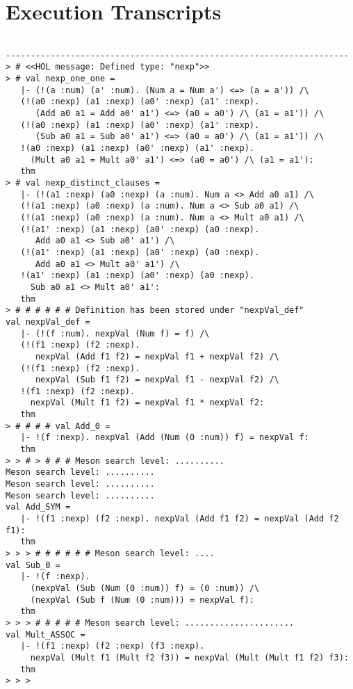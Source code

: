 \documentclass{report}
\begin{document}
\section{Execution Transcripts}
\label{sec:exec-transcr-3}

\setcounter{sessioncount}{0}
\begin{session}
  \begin{scriptsize}
\begin{verbatim}

---------------------------------------------------------------------
> # <<HOL message: Defined type: "nexp">>
> # val nexp_one_one =
   |- (!(a :num) (a' :num). (Num a = Num a') <=> (a = a')) /\
   (!(a0 :nexp) (a1 :nexp) (a0' :nexp) (a1' :nexp).
      (Add a0 a1 = Add a0' a1') <=> (a0 = a0') /\ (a1 = a1')) /\
   (!(a0 :nexp) (a1 :nexp) (a0' :nexp) (a1' :nexp).
      (Sub a0 a1 = Sub a0' a1') <=> (a0 = a0') /\ (a1 = a1')) /\
   !(a0 :nexp) (a1 :nexp) (a0' :nexp) (a1' :nexp).
     (Mult a0 a1 = Mult a0' a1') <=> (a0 = a0') /\ (a1 = a1'):
   thm
> # val nexp_distinct_clauses =
   |- (!(a1 :nexp) (a0 :nexp) (a :num). Num a <> Add a0 a1) /\
   (!(a1 :nexp) (a0 :nexp) (a :num). Num a <> Sub a0 a1) /\
   (!(a1 :nexp) (a0 :nexp) (a :num). Num a <> Mult a0 a1) /\
   (!(a1' :nexp) (a1 :nexp) (a0' :nexp) (a0 :nexp).
      Add a0 a1 <> Sub a0' a1') /\
   (!(a1' :nexp) (a1 :nexp) (a0' :nexp) (a0 :nexp).
      Add a0 a1 <> Mult a0' a1') /\
   !(a1' :nexp) (a1 :nexp) (a0' :nexp) (a0 :nexp).
     Sub a0 a1 <> Mult a0' a1':
   thm
> # # # # # # Definition has been stored under "nexpVal_def"
val nexpVal_def =
   |- (!(f :num). nexpVal (Num f) = f) /\
   (!(f1 :nexp) (f2 :nexp).
      nexpVal (Add f1 f2) = nexpVal f1 + nexpVal f2) /\
   (!(f1 :nexp) (f2 :nexp).
      nexpVal (Sub f1 f2) = nexpVal f1 - nexpVal f2) /\
   !(f1 :nexp) (f2 :nexp).
     nexpVal (Mult f1 f2) = nexpVal f1 * nexpVal f2:
   thm
> # # # # val Add_0 =
   |- !(f :nexp). nexpVal (Add (Num (0 :num)) f) = nexpVal f:
   thm
> > # > # # # Meson search level: ..........
Meson search level: ..........
Meson search level: ..........
Meson search level: ..........
val Add_SYM =
   |- !(f1 :nexp) (f2 :nexp). nexpVal (Add f1 f2) = nexpVal (Add f2 f1):
   thm
> > > # # # # # # Meson search level: ....
val Sub_0 =
   |- !(f :nexp).
     (nexpVal (Sub (Num (0 :num)) f) = (0 :num)) /\
     (nexpVal (Sub f (Num (0 :num))) = nexpVal f):
   thm
> > > # # # # # Meson search level: ......................
val Mult_ASSOC =
   |- !(f1 :nexp) (f2 :nexp) (f3 :nexp).
     nexpVal (Mult f1 (Mult f2 f3)) = nexpVal (Mult (Mult f1 f2) f3):
   thm
> > > 

\end{verbatim}
  \end{scriptsize}
\end{session}
\end{document}
